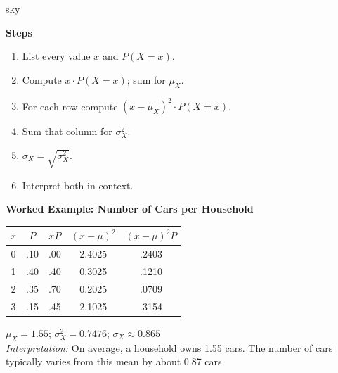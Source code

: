 \documentclass[10pt]{article}
\begin{document}
\begin{skillbox}{sky}
\begin{minipage}[t]{0.48\linewidth}
    \textbf{Steps}
    \begin{enumerate}
        \item List every value $x$ and $P(X=x)$.
        \item Compute $x \cdot P(X=x)$; sum for $\mu_X$.
        \item For each row compute $(x - \mu_X)^2 \cdot P(X=x)$.
        \item Sum that column for $\sigma^2_X$.
        \item $\sigma_X = \sqrt{\sigma^2_X}$.
        \item Interpret both in context.
    \end{enumerate}
\end{minipage}
\hfill
\begin{minipage}[t]{0.48\linewidth}
    \textbf{Worked Example: Number of Cars per Household}
    \small
    \renewcommand{\arraystretch}{1.4}
    \begin{tabular}{@{}ccccc@{}}
    $x$ & $P$ & $xP$ & $(x{-}\mu)^2$ & $(x{-}\mu)^2 P$ \\
    \hline
    0 & .10 & .00 & 2.4025 & .2403 \\
    1 & .40 & .40 & 0.3025 & .1210 \\
    2 & .35 & .70 & 0.2025 & .0709 \\
    3 & .15 & .45 & 2.1025 & .3154 \\
    \end{tabular}
    $\mu_X = 1.55$; $\sigma^2_X = 0.7476$; $\sigma_X \approx 0.865$\\[4pt]
    \textit{Interpretation:} On average, a household owns 1.55 cars. The number of
    cars typically varies from this mean by about 0.87 cars.
\end{minipage}
\end{skillbox}
\end{document}
